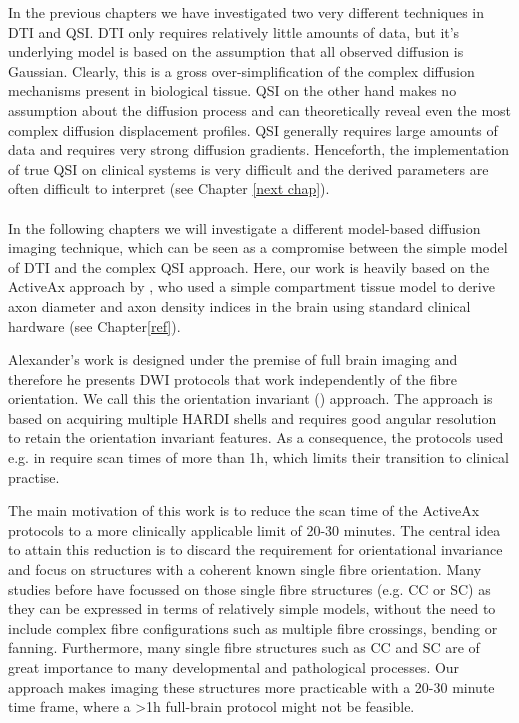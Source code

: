 In the previous chapters we have investigated two very different techniques in \gls{DTI} and \gls{QSI}. \gls{DTI} only requires relatively little amounts of data, but it's underlying model is based on the assumption that all observed diffusion is Gaussian. Clearly, this is a gross over-simplification of the complex diffusion mechanisms present in biological tissue. \gls{QSI} on the other hand makes no assumption about the diffusion process and can theoretically reveal even the most complex diffusion displacement profiles. \gls{QSI} generally requires large amounts of data and requires very strong diffusion gradients. Henceforth, the implementation of true \gls{QSI} on clinical systems is very difficult and the derived parameters are often difficult to interpret (see Chapter \ref{next chap}).
\paragraph{}
In the following chapters we will investigate a different model-based diffusion imaging technique, which can be seen as a compromise between the simple model of \gls{DTI} and the complex \gls{QSI} approach. Here, our work is heavily based on the ActiveAx approach by \citet{Alexander:2008}, who used a simple compartment tissue model to derive axon diameter and axon density indices in the brain using standard clinical hardware (see Chapter\ref{ref}).


Alexander's work is designed under the premise of full brain imaging and therefore he presents DWI protocols that work independently of the fibre orientation. We call this the orientation invariant ({\OI}) approach. The {\OI} approach is based on acquiring multiple HARDI shells and requires good angular resolution to retain the orientation invariant features. As a consequence, the {\OI} protocols used e.g. in \citep{Alexander:2010} require scan times of more than 1h, which limits their transition to clinical practise.


The main motivation of this work is to reduce the scan time of the ActiveAx protocols to a more clinically applicable limit of 20-30 minutes. The central idea to attain this reduction is to discard the requirement for orientational invariance and focus on structures with a coherent known single fibre orientation. Many studies before have focussed on those single fibre structures (e.g. \gls{CC} or \gls{SC}) as they can be expressed in terms of relatively simple models, without the need to include complex fibre configurations such as multiple fibre crossings, bending or fanning. Furthermore, many single fibre structures such as \gls{CC} and \gls{SC} are of great importance to many developmental and pathological processes. Our approach makes imaging these structures more practicable with a 20-30 minute time frame, where a >1h full-brain protocol might not be feasible.
